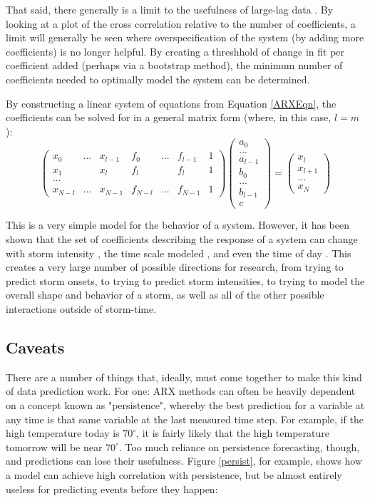 \documentclass[10pt]{article}
\begin{document}
That said, there generally is a limit to the usefulness of large-lag data \citep{ExtremeEvents}. By looking at a plot of the cross correlation relative to the number of coefficients, a limit will generally be seen where overspecification of the system (by adding more coefficients) is no longer helpful. By creating a threshhold of change in fit per coefficient added (perhaps via a bootstrap method), the minimum number of coefficients needed to optimally model the system can be determined.

By constructing a linear system of equations from Equation \ref{ARXEqn}, the coefficients can be solved for in a general matrix form (where, in this case, $l=m$):
\[
\left( \begin{array}{ccccccc}
x_0 & ... & x_{l-1} & f_0 & ... & f_{l-1} & 1\\
x_1 &     & x_l & f_l &  &f_l & 1\\
... &     &     &     &  &   & \\
x_{N-l} & ... & x_{N-1} & f_{N-l} & ... & f_{N-1} & 1
\end{array} \right)
\left(\begin{array}{c}
a_0\\...\\a_{l-1}\\b_0\\...\\b_{l-1}\\c
\end{array}\right)
=
\left(
\begin{array}{c}
x_l \\ x_{l+1} \\ ... \\ x_{N}
\end{array}
\right)
\]

This is a very simple model for the behavior of a system. However, it has been shown that the set of coefficients describing the response of a system can change with storm intensity \citep{ARXEqn}, the time scale modeled \citep{Coupling}, and even the time of day \citep{VBzAL}. This creates a very large number of possible directions for research, from trying to predict storm onsets, to trying to predict storm intensities, to trying to model the overall shape and behavior of a storm, as well as all of the other possible interactions outside of storm-time. 

\subsection{Caveats}
There are a number of things that, ideally, must come together to make this kind of data prediction work. For one: ARX methods can often be heavily dependent on a concept known as "persistence", whereby the best prediction for a variable at any time is that same variable at the last measured time step. For example, if the high temperature today is $70^\circ$, it is fairly likely that the high temperature tomorrow will be near $70^\circ$. Too much reliance on persistence forecasting, though, and predictions can lose their usefulness. Figure \ref{persist}, for example, shows how a model can achieve high correlation with persistence, but be almost entirely useless for predicting events before they happen:
\end{document}
